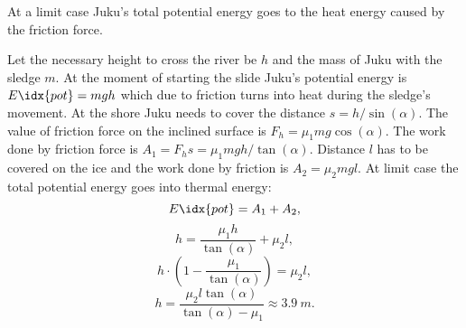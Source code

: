 \hinteng
At a limit case Juku’s total potential energy goes to the heat energy caused by the friction force.

\solueng
Let the necessary height to cross the river be $h$ and the mass of Juku with the sledge $m$. At the moment of starting the slide Juku’s potential energy is $E\idx{pot} = mgh$ which due to friction turns into heat during the sledge’s movement. At the shore Juku needs to cover the distance $s = h/\sin(\alpha)$. The value of friction force on the inclined surface is $F_h=\mu_1 mg \cos(\alpha)$. The work done by friction force is $A_1 = F_h s = {\mu_1}mgh/\tan(\alpha)$. Distance $l$ has to be covered on the ice and the work done by friction is $A_2 = {\mu_2}mgl$. At limit case the total potential energy goes into thermal energy: 
$$E\idx{pot} = A_1 + A_2,$$
$$h =\frac{\mu_1 h}{\tan(\alpha)} + {\mu_2}   l, $$
$$h \cdot \left(1 - \frac{\mu_1}{\tan(\alpha)}\right) = {\mu_2}  l,$$
$$h = \frac{\mu_2 l \tan(\alpha)}{\tan(\alpha) - {\mu_1}} \approx \SI{3.9}{m}.$$
\probend